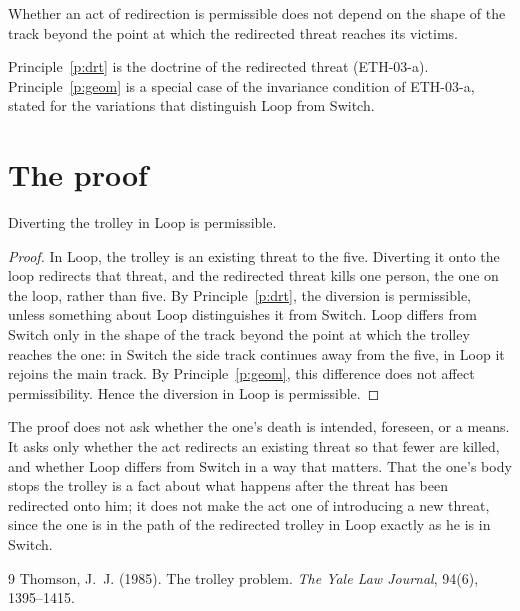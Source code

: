 \documentclass{situationist-preprint}
\begin{document}
\begin{principle}[Geometry]\label{p:geom}
Whether an act of redirection is permissible does not depend on the shape of the track beyond the point at which the redirected threat reaches its victims.
\end{principle}

Principle~\ref{p:drt} is the doctrine of the redirected threat (ETH-03-a). Principle~\ref{p:geom} is a special case of the invariance condition of ETH-03-a, stated for the variations that distinguish Loop from Switch.

\section{The proof}

\begin{theorem}\label{t:loop}
Diverting the trolley in Loop is permissible.
\end{theorem}

\begin{proof}
In Loop, the trolley is an existing threat to the five. Diverting it onto the loop redirects that threat, and the redirected threat kills one person, the one on the loop, rather than five. By Principle~\ref{p:drt}, the diversion is permissible, unless something about Loop distinguishes it from Switch. Loop differs from Switch only in the shape of the track beyond the point at which the trolley reaches the one: in Switch the side track continues away from the five, in Loop it rejoins the main track. By Principle~\ref{p:geom}, this difference does not affect permissibility. Hence the diversion in Loop is permissible.
\end{proof}

The proof does not ask whether the one's death is intended, foreseen, or a means. It asks only whether the act redirects an existing threat so that fewer are killed, and whether Loop differs from Switch in a way that matters. That the one's body stops the trolley is a fact about what happens after the threat has been redirected onto him; it does not make the act one of introducing a new threat, since the one is in the path of the redirected trolley in Loop exactly as he is in Switch.

\begin{thebibliography}{9}\small
{} Thomson, J.~J. (1985). The trolley problem. \emph{The Yale Law Journal}, 94(6), 1395--1415.
\end{thebibliography}
\end{document}
